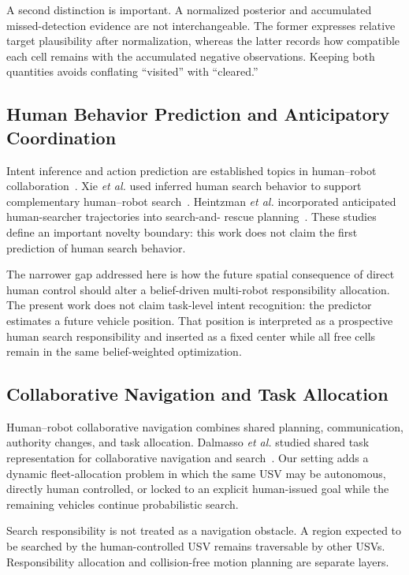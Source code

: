 \documentclass[conference]{IEEEtran}
\begin{document}
A second distinction is important. A normalized posterior and accumulated
missed-detection evidence are not interchangeable. The former expresses
relative target plausibility after normalization, whereas the latter records
how compatible each cell remains with the accumulated negative observations.
Keeping both quantities avoids conflating ``visited'' with ``cleared.''

\subsection{Human Behavior Prediction and Anticipatory Coordination}

Intent inference and action prediction are established topics in human--robot
collaboration~\cite{b4}. Xie \emph{et al.} used inferred human search behavior
to support complementary human--robot search~\cite{b2}. Heintzman \emph{et
al.} incorporated anticipated human-searcher trajectories into search-and-
rescue planning~\cite{b3}. These studies define an important novelty boundary:
this work does not claim the first prediction of human search behavior.

The narrower gap addressed here is how the future spatial consequence of
direct human control should alter a belief-driven multi-robot responsibility
allocation. The present work does not claim task-level intent recognition:
the predictor estimates a future vehicle position. That position is interpreted
as a prospective human search responsibility and inserted as a fixed center
while all free cells remain in the same belief-weighted optimization.

\subsection{Collaborative Navigation and Task Allocation}

Human--robot collaborative navigation combines shared planning, communication,
authority changes, and task allocation. Dalmasso \emph{et al.} studied shared
task representation for collaborative navigation and search~\cite{b5}. Our
setting adds a dynamic fleet-allocation problem in which the same USV may be
autonomous, directly human controlled, or locked to an explicit human-issued
goal while the remaining vehicles continue probabilistic search.

Search responsibility is not treated as a navigation obstacle. A region
expected to be searched by the human-controlled USV remains traversable by
other USVs. Responsibility allocation and collision-free motion planning are
separate layers.
\end{document}
